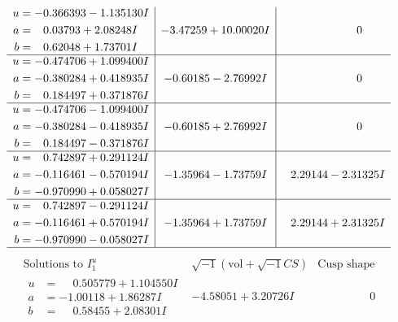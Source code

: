 \documentclass[1p]{elsarticle_modified}
\theoremstyle{definition}
\newcommand{\I}{\sqrt{-1}}
\begin{document}
$$\begin{array}{c|c|c}
\begin{aligned}
u &= -0.366393 - 1.135130 I \\
a &= \phantom{-}0.03793 + 2.08248 I \\
b &= \phantom{-}0.62048 + 1.73701 I\end{aligned}
 & -3.47259 + 10.00020 I & \phantom{-0.000000 } 0 \\ \hline\begin{aligned}
u &= -0.474706 + 1.099400 I \\
a &= -0.380284 + 0.418935 I \\
b &= \phantom{-}0.184497 + 0.371876 I\end{aligned}
 & -0.60185 - 2.76992 I & \phantom{-0.000000 } 0 \\ \hline\begin{aligned}
u &= -0.474706 - 1.099400 I \\
a &= -0.380284 - 0.418935 I \\
b &= \phantom{-}0.184497 - 0.371876 I\end{aligned}
 & -0.60185 + 2.76992 I & \phantom{-0.000000 } 0 \\ \hline\begin{aligned}
u &= \phantom{-}0.742897 + 0.291124 I \\
a &= -0.116461 - 0.570194 I \\
b &= -0.970990 + 0.058027 I\end{aligned}
 & -1.35964 - 1.73759 I & \phantom{-}2.29144 - 2.31325 I \\ \hline\begin{aligned}
u &= \phantom{-}0.742897 - 0.291124 I \\
a &= -0.116461 + 0.570194 I \\
b &= -0.970990 - 0.058027 I\end{aligned}
 & -1.35964 + 1.73759 I & \phantom{-}2.29144 + 2.31325 I\\
 \hline 
 \end{array}$$\newpage$$\begin{array}{c|c|c}  
\text{Solutions to }I^u_{1}& \I (\text{vol} + \sqrt{-1}CS) & \text{Cusp shape}\\
 \hline 
\begin{aligned}
u &= \phantom{-}0.505779 + 1.104550 I \\
a &= -1.00118 + 1.86287 I \\
b &= \phantom{-}0.58455 + 2.08301 I\end{aligned}
 & -4.58051 + 3.20726 I & \phantom{-0.000000 } 0 \\ \hline\begin{aligned}

\end{aligned}
\end{array}$$
\end{document}
